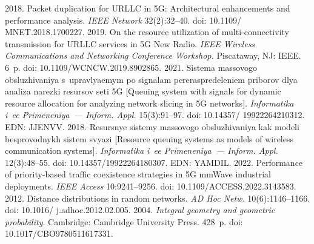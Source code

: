 \begin{multicols}{2}
{{\begin{thebibliography}{99}
 2018. 
Packet duplication for URLLC in 5G: Architectural enhancements and performance 
analysis. \textit{IEEE Network} 32(2):32--40. doi: 10.1109/ MNET.2018.1700227.
2019.
On the resource utilization of multi-connectivity transmission for URLLC 
services in 5G New Radio.
\textit{IEEE Wireless Communications and Networking 
Conference Workshop.} Piscataway, NJ: IEEE. 6~p. doi: 
10.1109/\mbox{WCNCW}.2019.8902865.
 2021. Sistema 
mas\-so\-vo\-go ob\-slu\-zhi\-va\-niya s~uprav\-lya\-emym po sig\-na\-lam pe\-re\-ras\-pre\-de\-le\-ni\-em 
pri\-bo\-rov dlya ana\-li\-za na\-rez\-ki re\-sur\-sov se\-ti 5G [Queuing system with signals for 
dynamic resource allocation for analyzing network slicing in 5G networks]. 
\textit{Informatika i~ee Primeneniya~--- Inform. Appl.} 15(3):91--97. doi: 
10.14357/ 19922264210312. EDN: JJENVV.
 2018. 
Re\-surs\-nye sis\-te\-my mas\-so\-vo\-go ob\-slu\-zhi\-va\-niya kak mo\-de\-li bes\-pro\-vod\-nykh sis\-tem 
svya\-zi [Resource queuing systems as models of wireless communication systems]. 
\textit{Informatika i~ee Primeneniya~--- Inform. Appl.} 12(3):48--55. doi: 
10.14357/19922264180307. EDN: YAMDIL.
2022. Performance of priority-based traffic coexistence strategies in 5G mmWave 
industrial deployments.
\textit{IEEE Access} 10:9241--9256.
doi: 10.1109/ACCESS.2022.3143583.
 2012. Distance distributions in random networks. \textit{AD Hoc 
Netw.} 10(6):1146--1166. doi: 10.1016/ j.adhoc.2012.02.005.
 2004. \textit{Integral geometry and geometric probability}. 
Cambridge: Cambridge University Press. 428~p. 
doi: 10.1017/CBO9780511617331.


\end{thebibliography}

 }
 }

\end{multicols}

\vspace*{-6pt}

